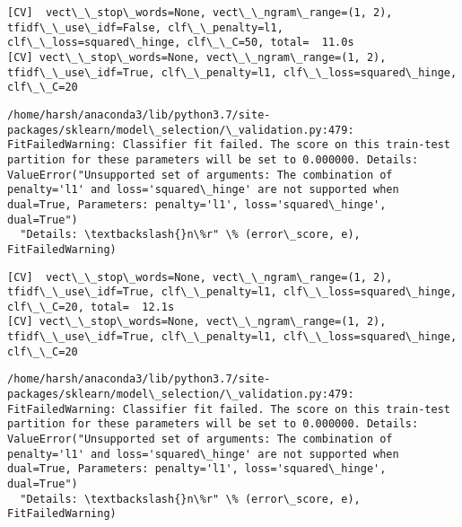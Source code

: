 \documentclass[11pt]{article}
\begin{document}
    \begin{Verbatim}[commandchars=\\\{\}]
[CV]  vect\_\_stop\_words=None, vect\_\_ngram\_range=(1, 2), tfidf\_\_use\_idf=False, clf\_\_penalty=l1, clf\_\_loss=squared\_hinge, clf\_\_C=50, total=  11.0s
[CV] vect\_\_stop\_words=None, vect\_\_ngram\_range=(1, 2), tfidf\_\_use\_idf=True, clf\_\_penalty=l1, clf\_\_loss=squared\_hinge, clf\_\_C=20 

    \end{Verbatim}

    \begin{Verbatim}[commandchars=\\\{\}]
/home/harsh/anaconda3/lib/python3.7/site-packages/sklearn/model\_selection/\_validation.py:479: FitFailedWarning: Classifier fit failed. The score on this train-test partition for these parameters will be set to 0.000000. Details: 
ValueError("Unsupported set of arguments: The combination of penalty='l1' and loss='squared\_hinge' are not supported when dual=True, Parameters: penalty='l1', loss='squared\_hinge', dual=True")
  "Details: \textbackslash{}n\%r" \% (error\_score, e), FitFailedWarning)

    \end{Verbatim}

    \begin{Verbatim}[commandchars=\\\{\}]
[CV]  vect\_\_stop\_words=None, vect\_\_ngram\_range=(1, 2), tfidf\_\_use\_idf=True, clf\_\_penalty=l1, clf\_\_loss=squared\_hinge, clf\_\_C=20, total=  12.1s
[CV] vect\_\_stop\_words=None, vect\_\_ngram\_range=(1, 2), tfidf\_\_use\_idf=True, clf\_\_penalty=l1, clf\_\_loss=squared\_hinge, clf\_\_C=20 

    \end{Verbatim}

    \begin{Verbatim}[commandchars=\\\{\}]
/home/harsh/anaconda3/lib/python3.7/site-packages/sklearn/model\_selection/\_validation.py:479: FitFailedWarning: Classifier fit failed. The score on this train-test partition for these parameters will be set to 0.000000. Details: 
ValueError("Unsupported set of arguments: The combination of penalty='l1' and loss='squared\_hinge' are not supported when dual=True, Parameters: penalty='l1', loss='squared\_hinge', dual=True")
  "Details: \textbackslash{}n\%r" \% (error\_score, e), FitFailedWarning)

    \end{Verbatim}
\end{document}

